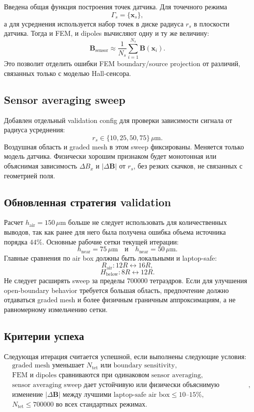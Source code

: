 \documentclass[12pt,a4paper]{article}
\begin{document}
Введена общая функция построения точек датчика. Для точечного режима
\[
    \Gamma_s = \{\mathbf x_s\},
\]
а для усреднения используется набор точек в диске радиуса \(r_s\) в плоскости
датчика. Тогда и FEM, и dipoles вычисляют одну и ту же величину:
\[
    \mathbf B_{\mathrm{sensor}}
    \approx
    \frac{1}{N_s}\sum_{i=1}^{N_s}\mathbf B(\mathbf x_i).
\]
Это позволит отделить ошибки FEM boundary/source projection от различий,
связанных только с моделью Hall-сенсора.

\subsection*{Sensor averaging sweep}

Добавлен отдельный validation config для проверки зависимости сигнала от
радиуса усреднения:
\[
    r_s\in\{10,25,50,75\}\,\mu\mathrm{m}.
\]
Воздушная область и graded mesh в этом sweep фиксированы. Меняется только
модель датчика. Физически хорошим признаком будет монотонная или объяснимая
зависимость \(\Delta B_x\) и \(|\Delta\mathbf B|\) от \(r_s\), без резких
скачков, не связанных с геометрией поля.

\subsection*{Обновленная стратегия validation}

Расчет \(h_{\mathrm{air}}=150\,\mu\mathrm{m}\) больше не следует использовать
для количественных выводов, так как ранее для него была получена ошибка объема
источника порядка \(44\%\). Основные рабочие сетки текущей итерации:
\[
    h_{\mathrm{near}}=75\,\mu\mathrm{m}
    \quad \text{и} \quad
    h_{\mathrm{near}}=50\,\mu\mathrm{m}.
\]
Главные сравнения по air box должны быть локальными и laptop-safe:
\[
    R_{\mathrm{air}}: 12R \leftrightarrow 16R,
\]
\[
    H_{\mathrm{below}}: 8R \leftrightarrow 12R.
\]
Не следует расширять sweep за пределы \(700000\) тетраэдров. Если для улучшения
open-boundary behavior требуется большая область, предпочтение должно
отдаваться graded mesh и более физичным граничным аппроксимациям, а не
равномерному измельчению сетки.

\subsection*{Критерии успеха}

Следующая итерация считается успешной, если выполнены следующие условия:
\[
\begin{aligned}
&\text{graded mesh уменьшает } N_{\mathrm{tet}}
  \text{ или boundary sensitivity},\\
&\text{FEM и dipoles сравниваются при одинаковом sensor averaging},\\
&\text{sensor averaging sweep дает устойчивую или физически объяснимую зависимость},\\
&\text{изменение }|\Delta\mathbf B|\text{ между лучшими laptop-safe air box}
  \le 10\text{--}15\%,\\
&N_{\mathrm{tet}}\le 700000 \text{ во всех стандартных режимах}.
\end{aligned}
\]
\end{document}
